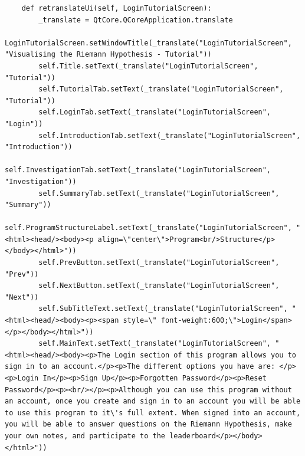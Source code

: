 \documentclass{article}
\begin{document}
\begin{lstlisting}
    def retranslateUi(self, LoginTutorialScreen):
        _translate = QtCore.QCoreApplication.translate
        LoginTutorialScreen.setWindowTitle(_translate("LoginTutorialScreen", "Visualising the Riemann Hypothesis - Tutorial"))
        self.Title.setText(_translate("LoginTutorialScreen", "Tutorial"))
        self.TutorialTab.setText(_translate("LoginTutorialScreen", "Tutorial"))
        self.LoginTab.setText(_translate("LoginTutorialScreen", "Login"))
        self.IntroductionTab.setText(_translate("LoginTutorialScreen", "Introduction"))
        self.InvestigationTab.setText(_translate("LoginTutorialScreen", "Investigation"))
        self.SummaryTab.setText(_translate("LoginTutorialScreen", "Summary"))
        self.ProgramStructureLabel.setText(_translate("LoginTutorialScreen", "<html><head/><body><p align=\"center\">Program<br/>Structure</p></body></html>"))
        self.PrevButton.setText(_translate("LoginTutorialScreen", "Prev"))
        self.NextButton.setText(_translate("LoginTutorialScreen", "Next"))
        self.SubTitleText.setText(_translate("LoginTutorialScreen", "<html><head/><body><p><span style=\" font-weight:600;\">Login</span></p></body></html>"))
        self.MainText.setText(_translate("LoginTutorialScreen", "<html><head/><body><p>The Login section of this program allows you to sign in to an account.</p><p>The different options you have are: </p><p>Login In</p><p>Sign Up</p><p>Forgotten Password</p><p>Reset Password</p><p><br/></p><p>Although you can use this program without an account, once you create and sign in to an account you will be able to use this program to it\'s full extent. When signed into an account, you will be able to answer questions on the Riemann Hypothesis, make your own notes, and participate to the leaderboard</p></body></html>"))
\end{lstlisting}
\end{document}
